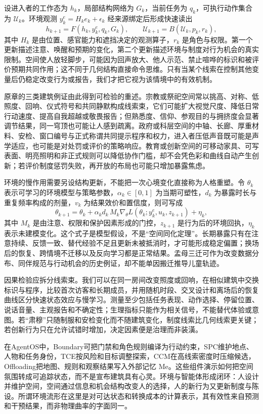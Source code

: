设进入者的工作态为 $h_k$，局部结构网络为 $G_k$，当前任务为 $q_k$，可执行动作集合为 $\mathcal U_k$。环境观测 $y_k^e=H_k e_k+\epsilon_k$ 经来源绑定后形成快速读出
\[
h_{k+1}=F(h_k,y_k^e,q_k,G_k),\qquad
\mathcal U_{k+1}=B(\mathcal U_k,p_k,r_k),
\]
其中 $H_k$ 是由位置、感官能力和遮挡决定的观测算子，$r_k$ 是角色与权限。第一个更新描述注意、唤醒和预期的变化，第二个更新描述环境与制度对行为机会的真实限制。空间使人放轻脚步，可能因为回声放大、他人示范、禁止喧哗的标识和被评价预期共同作用；这不同于几何结构直接命令思维。只有当某个线索在控制其他变量后仍稳定改变行为或报告，我们才把它视为该情境中的有效机制。

原章的三类建筑例证由此得到可检验的重述。宗教或祭祀空间常以挑高、对称、低照度、回响、仪式符号和共同静默构成线索束，它们可能扩大视觉尺度、降低日常行动速度、提高自我超越或敬畏报告；但熟悉度、信仰、参观目的与拥挤度会显著调节结果，同一穹顶也可能让人感到疏离。政府或科层空间的中轴、长廊、厚重材料、安检、窗口编号与正式称谓共同提示程序和权力，进入者压低声音既可能是声学适应，也可能是对处罚或评价的策略响应。教育或创新空间的可移动家具、可写表面、明亮照明和非正式规则可以降低协作门槛，却不会凭色彩和曲线自动产生创新；若评价制度惩罚失败，再开放的布局也可能只增加暴露焦虑。

环境的慢作用需要另设结构更新，不能把一次心境变化直接称为人格重塑。令 $\theta_k$ 表示可学习的环境模型与策略参数，$\alpha_k\in[0,1]$ 为当期可塑性，$d_k$ 为暴露时长与重复频率构成的剂量，$v_k$ 为结果效价和置信度，则可写成
\[
\theta_{k+1}=\theta_k+\alpha_k d_k\,M_k\nabla_\theta L(\theta_k;y_k^e,u_k,z_{k+1})+\eta_k,
\]
其中 $M_k$ 是由注意、权限和保护因素形成的门控，$z_{k+1}$ 是行为后的环境回执，$\eta_k$ 表示未建模变化。这个式子是模型假设，不是“空间同化定理”。长期暴露只有在注意持续、反馈一致、替代经验不足且更新未被抵消时，才可能形成稳定偏置；换场后的恢复、跨情境不迁移以及反向学习都是正常结果。孟母三迁可作为改变数据分布、同伴规范与行动机会的历史例证，却不能单因搬迁推导儿童轨迹。

因果检验应拆分线索束。我们可以在同一房间改变照度或回响，在相似建筑中交换标识与程序，比较首次访客和长期成员，并用随机时段、交叉设计和离场后的恢复曲线区分快速状态效应与慢学习。测量至少包括任务表现、动作选择、停留位置、说话音量、主观报告和不确定性；生理指标只能作为相关信号，不能替代体验或意图。若“肃穆”只随制服和安检变化而不随建筑变化，制度线索比几何线索更关键；若创新行为只在允许试错时增加，决定因素便是治理而非装潢。

在AgentOS中，Boundary可把门禁和角色规则编译为行动约束，SPC维护地点、人物和任务身份，TCE按风险和目标调整探索，CCM在高线索密度时压缩候选，Offloading把地图、规则和观察结果写入外部记忆 $\mathrm{Me}$。这些组件演示如何把空间氛围转成可追踪状态，而不是宣布建筑具有心灵。环境与智能体形成闭环：人设计并维护空间，空间通过信息和机会结构改变人的选择，人的新行为又更新制度与陈设。所谓环境流形在这里是对可达状态和转换成本的计算表示，其有效性来自预测和干预结果，而非物理曲率的字面同一。

